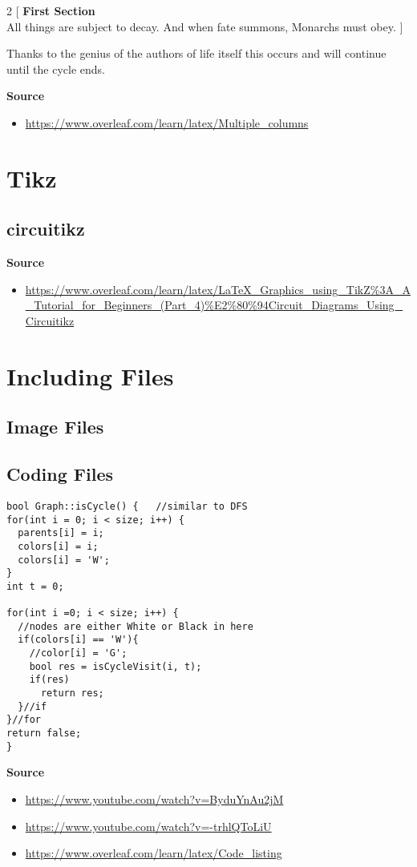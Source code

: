 \documentclass[10pt, letterpaper]{article}
\begin{document}
\begin{multicols}{2}
  [
  \noindent \textbf{First Section}\\
  All things are subject to decay. And when fate summons, Monarchs must obey.
  ]
  \blindtext
\end{multicols}
Thanks to the genius of the authors of life itself this occurs and will continue until the cycle ends.

\noindent\textbf{Source}
\begin{itemize}
  \item \url{https://www.overleaf.com/learn/latex/Multiple_columns}
\end{itemize}

\section{Tikz}
\subsection{circuitikz}
\textbf{Source}
\begin{itemize}
  \item \url{https://www.overleaf.com/learn/latex/LaTeX_Graphics_using_TikZ%3A_A_Tutorial_for_Beginners_(Part_4)%E2%80%94Circuit_Diagrams_Using_Circuitikz}
\end{itemize}

\section{Including Files}
\subsection{Image Files}
\subsection{Coding Files}
\lstset{style=basicstyle}
\begin{lstlisting}[title=Function: Graph::isCycle()]
bool Graph::isCycle() {   //similar to DFS
for(int i = 0; i < size; i++) {
  parents[i] = i;
  colors[i] = i;
  colors[i] = 'W';
}
int t = 0;

for(int i =0; i < size; i++) {
  //nodes are either White or Black in here
  if(colors[i] == 'W'){
    //color[i] = 'G';
    bool res = isCycleVisit(i, t);
    if(res)
      return res;
  }//if
}//for
return false;
}
\end{lstlisting}
\textbf{Source}
\begin{itemize}
  \item \url{https://www.youtube.com/watch?v=ByduYnAu2jM}
  \item \url{https://www.youtube.com/watch?v=-trhlQToLiU}
  \item \url{https://www.overleaf.com/learn/latex/Code_listing}
\end{itemize}
\end{document}

